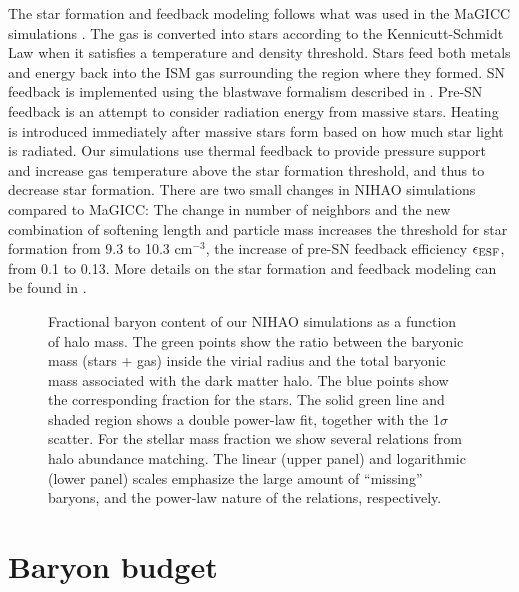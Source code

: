 \documentclass[useAMS,usenatbib]{mn2e}
\begin{document}
The star formation and feedback modeling follows what was used in the
MaGICC simulations \citep{Stinson13}.   The gas is converted into
stars according to the Kennicutt-Schmidt Law when it satisfies a
temperature and density threshold. Stars feed both metals and energy
back into the ISM gas surrounding the region where they formed. SN
feedback is implemented using the blastwave formalism described in
\citet{Stinson06}. Pre-SN feedback is an attempt to consider radiation
energy from massive stars. Heating is introduced immediately after
massive stars form based on how much star light is radiated.  Our
simulations use thermal feedback to provide pressure support and
increase gas temperature above the star formation threshold, and thus
to decrease star formation.  There are two small changes in NIHAO
simulations compared to MaGICC: The change in  number of neighbors and
the new combination of softening length and  particle mass increases
the threshold for star formation from  9.3 to 10.3 cm$^{-3}$, the
increase of pre-SN feedback efficiency $\epsilon_{\rm ESF}$, from 0.1
to 0.13.  More details on the star formation and feedback modeling can
be found in \citet{Wang15}.


\begin{figure}
\centerline{
}
\caption{Fractional baryon content of our NIHAO simulations  as a
  function of halo mass. The green points show the ratio between the
  baryonic mass (stars + gas) inside the virial radius and the total
  baryonic mass associated with the dark matter halo. The blue points
  show the corresponding fraction for the stars. The solid green line
  and shaded region shows a double power-law fit, together with the
  1$\sigma$ scatter. For the stellar mass fraction we show several
  relations from halo abundance matching.    The linear (upper panel)
  and logarithmic (lower panel) scales emphasize the large amount of
  ``missing'' baryons, and the power-law nature of the relations,
  respectively.}
\label{fig:budget}
\end{figure}





\section{Baryon budget}
\label{sec:budget}
\end{document}

